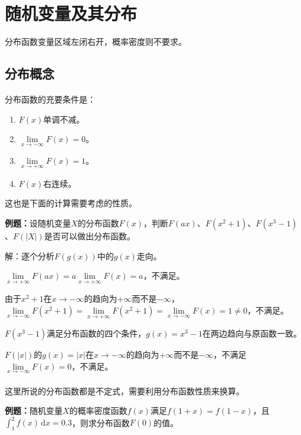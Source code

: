 \section{随机变量及其分布}
分布函数变量区域左闭右开，概率密度则不要求。

\subsection{分布概念}

\paragraph{}

分布函数的充要条件是：

\begin{enumerate}
    \item $F(x)$单调不减。
    \item $\lim\limits_{x\to-\infty}F(x)=0$。
    \item $\lim\limits_{x\to+\infty}F(x)=1$。
    \item $F(x)$右连续。
\end{enumerate}

这也是下面的计算需要考虑的性质。

\textbf{例题：}设随机变量$X$的分布函数$F(x)$，判断$F(ax)$、$F(x^2+1)$、$F(x^3-1)$、$F(\vert X\vert)$是否可以做出分布函数。

解：逐个分析$F(g(x))$中的$g(x)$走向。

$\lim\limits_{x\to+\infty}F(ax)=a\lim\limits_{x\to+\infty}F(x)=a$，不满足。

由于$x^2+1$在$x\to-\infty$的趋向为$+\infty$而不是$-\infty$，$\lim\limits_{x\to-\infty}F(x^2+1)=\lim\limits_{x\to+\infty}F(x^2+1)=\lim\limits_{x\to-\infty}F(x)=1\neq0$，不满足。

$F(x^3-1)$满足分布函数的四个条件，$g(x)=x^3-1$在两边趋向与原函数一致。

$F(\vert x\vert)$的$g(x)=\vert x\vert$在$x\to-\infty$的趋向为$+\infty$而不是$-\infty$，不满足$\lim\limits_{x\to-\infty}F(x)=0$，不满足。

\paragraph{}

这里所说的分布函数都是不定式，需要利用分布函数性质来换算。

\textbf{例题：}随机变量$X$的概率密度函数$f(x)$满足$f(1+x)=f(1-x)$，且$\int_1^2f(x)\,\textrm{d}x=0.3$，则求分布函数$F(0)$的值。

